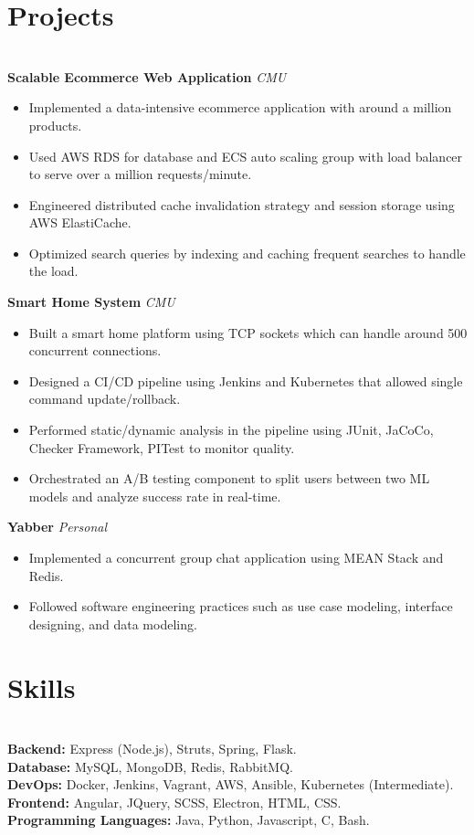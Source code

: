 \documentclass{resume}
\begin{document}
\section*{Projects}
\titlerule
\noindent
\\
\textbf{Scalable Ecommerce Web Application} \hfill \textit{CMU}
\begin{itemize}
  \item Implemented a data-intensive ecommerce application with around a million products.
  \item Used AWS RDS for database and ECS auto scaling group with load balancer to serve over a million requests/minute.
  \item Engineered distributed cache invalidation strategy and session storage using AWS ElastiCache.
  \item Optimized search queries by indexing and caching frequent searches to handle the load.
\end{itemize}
\textbf{Smart Home System} \hfill \textit{CMU}
\begin{itemize}
  \item Built a smart home platform using TCP sockets which can handle around 500 concurrent connections.
  \item Designed a CI/CD pipeline using Jenkins and Kubernetes that allowed single command update/rollback.
  \item Performed static/dynamic analysis in the pipeline using JUnit, JaCoCo, Checker Framework, PITest to monitor quality.
  \item Orchestrated an A/B testing component to split users between two ML models and analyze success rate in real-time.
\end{itemize}
\textbf{Yabber} \hfill \textit{Personal}
\begin{itemize}
  \item Implemented a concurrent group chat application using MEAN Stack and Redis.
  \item Followed software engineering practices such as use case modeling, interface designing, and data modeling.
\end{itemize}
\section*{Skills}
\titlerule
\noindent
\\
\textbf{Backend:} Express (Node.js), Struts, Spring, Flask. \\
\textbf{Database:} MySQL, MongoDB, Redis, RabbitMQ. \\
\textbf{DevOps:} Docker, Jenkins, Vagrant, AWS, Ansible, Kubernetes (Intermediate). \\
\textbf{Frontend:} Angular, JQuery, SCSS, Electron, HTML, CSS. \\
\textbf{Programming Languages:} Java, Python, Javascript, C, Bash.\\
\end{document}
